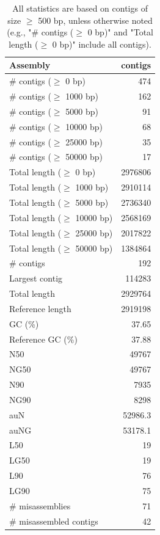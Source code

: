 \documentclass[12pt,a4paper]{article}
\begin{document}
\begin{table}[ht]
\begin{center}
\caption{All statistics are based on contigs of size $\geq$ 500 bp, unless otherwise noted (e.g., "\# contigs ($\geq$ 0 bp)" and "Total length ($\geq$ 0 bp)" include all contigs).}
\begin{tabular}{|l*{1}{|r}|}
\hline
Assembly & contigs \\ \hline
\# contigs ($\geq$ 0 bp) & 474 \\ \hline
\# contigs ($\geq$ 1000 bp) & 162 \\ \hline
\# contigs ($\geq$ 5000 bp) & 91 \\ \hline
\# contigs ($\geq$ 10000 bp) & 68 \\ \hline
\# contigs ($\geq$ 25000 bp) & 35 \\ \hline
\# contigs ($\geq$ 50000 bp) & 17 \\ \hline
Total length ($\geq$ 0 bp) & 2976806 \\ \hline
Total length ($\geq$ 1000 bp) & 2910114 \\ \hline
Total length ($\geq$ 5000 bp) & 2736340 \\ \hline
Total length ($\geq$ 10000 bp) & 2568169 \\ \hline
Total length ($\geq$ 25000 bp) & 2017822 \\ \hline
Total length ($\geq$ 50000 bp) & 1384864 \\ \hline
\# contigs & 192 \\ \hline
Largest contig & 114283 \\ \hline
Total length & 2929764 \\ \hline
Reference length & 2919198 \\ \hline
GC (\%) & 37.65 \\ \hline
Reference GC (\%) & 37.88 \\ \hline
N50 & 49767 \\ \hline
NG50 & 49767 \\ \hline
N90 & 7935 \\ \hline
NG90 & 8298 \\ \hline
auN & 52986.3 \\ \hline
auNG & 53178.1 \\ \hline
L50 & 19 \\ \hline
LG50 & 19 \\ \hline
L90 & 76 \\ \hline
LG90 & 75 \\ \hline
\# misassemblies & 71 \\ \hline
\# misassembled contigs & 42 \\ \hline

\end{tabular}
\end{center}
\end{table}
\end{document}
